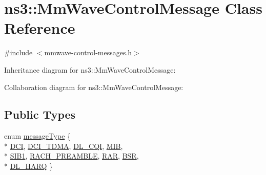 \hypertarget{classns3_1_1MmWaveControlMessage}{}\section{ns3\+:\+:Mm\+Wave\+Control\+Message Class Reference}
\label{classns3_1_1MmWaveControlMessage}


{\ttfamily \#include $<$mmwave-\/control-\/messages.\+h$>$}



Inheritance diagram for ns3\+:\+:Mm\+Wave\+Control\+Message\+:


Collaboration diagram for ns3\+:\+:Mm\+Wave\+Control\+Message\+:
\subsection*{Public Types}
\begin{DoxyCompactItemize}
\item 
enum \hyperlink{classns3_1_1MmWaveControlMessage_afd7af53dea4ef8b652cf206acd508869}{message\+Type} \{ \\*
\hyperlink{classns3_1_1MmWaveControlMessage_afd7af53dea4ef8b652cf206acd508869ae1e86a2452265b33d378dbc5806f32fe}{D\+CI}, 
\hyperlink{classns3_1_1MmWaveControlMessage_afd7af53dea4ef8b652cf206acd508869a3def507a310c2ded862e95b929cfd34b}{D\+C\+I\+\_\+\+T\+D\+MA}, 
\hyperlink{classns3_1_1MmWaveControlMessage_afd7af53dea4ef8b652cf206acd508869a86a81d8d22142bcbb5be5abe46eddb97}{D\+L\+\_\+\+C\+QI}, 
\hyperlink{classns3_1_1MmWaveControlMessage_afd7af53dea4ef8b652cf206acd508869a4826df1ed8d6aaefe44d8ddde816d6ea}{M\+IB}, 
\\*
\hyperlink{classns3_1_1MmWaveControlMessage_afd7af53dea4ef8b652cf206acd508869abfe62627190d14786158aab72b88fdb2}{S\+I\+B1}, 
\hyperlink{classns3_1_1MmWaveControlMessage_afd7af53dea4ef8b652cf206acd508869aa5c50c57231f74cdc23fb3f2b86e1728}{R\+A\+C\+H\+\_\+\+P\+R\+E\+A\+M\+B\+LE}, 
\hyperlink{classns3_1_1MmWaveControlMessage_afd7af53dea4ef8b652cf206acd508869ad95e9cf8fc7680fdaa34baa212b50f60}{R\+AR}, 
\hyperlink{classns3_1_1MmWaveControlMessage_afd7af53dea4ef8b652cf206acd508869ae6dfe19c64eac4df7cf4603d0ca69fd4}{B\+SR}, 
\\*
\hyperlink{classns3_1_1MmWaveControlMessage_afd7af53dea4ef8b652cf206acd508869a8c97d0661ffe92534bc6479bc6d8ff45}{D\+L\+\_\+\+H\+A\+RQ}
 \}
\end{DoxyCompactItemize}
